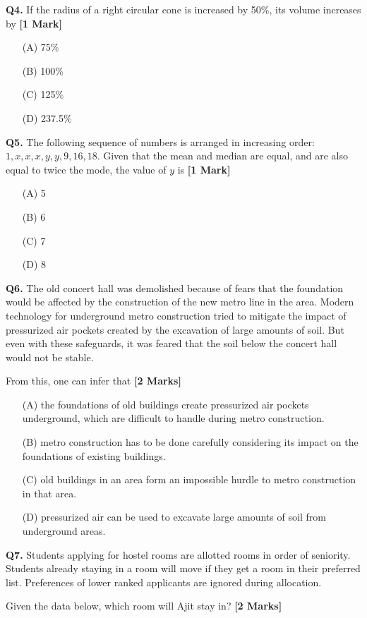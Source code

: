 \documentclass[11pt]{article}
\newcommand{\questiona}[2]{
    \noindent\textbf{Q#2.} #1 \hfill \textbf{[1 Mark]}
}
\newcommand{\questionb}[2]{
    \noindent\textbf{Q#2.} #1 \hfill \textbf{[2 Marks]}
}
\begin{document}
\questiona{If the radius of a right circular cone is increased by 50\%, its volume increases by}{4}
\begin{enumerate}
    \item[(A)] 75\%  
    \item[(B)] 100\%  
    \item[(C)] 125\%  
    \item[(D)] 237.5\%  
\end{enumerate}
\vspace{0.5cm}

\questiona{The following sequence of numbers is arranged in increasing order: $1, x, x, x, y, y, 9, 16, 18$. Given that the mean and median are equal, and are also equal to twice the mode, the value of $y$ is}{5}
\begin{enumerate}
    \item[(A)] 5  
    \item[(B)] 6  
    \item[(C)] 7  
    \item[(D)] 8  
\end{enumerate}
\vspace{0.5cm}

\questionb{The old concert hall was demolished because of fears that the foundation would be affected by the construction of the new metro line in the area. Modern technology for underground metro construction tried to mitigate the impact of pressurized air pockets created by the excavation of large amounts of soil. But even with these safeguards, it was feared that the soil below the concert hall would not be stable.

From this, one can infer that}{6}
\begin{enumerate}
    \item[(A)] the foundations of old buildings create pressurized air pockets underground, which are difficult to handle during metro construction.  
    \item[(B)] metro construction has to be done carefully considering its impact on the foundations of existing buildings.  
    \item[(C)] old buildings in an area form an impossible hurdle to metro construction in that area.  
    \item[(D)] pressurized air can be used to excavate large amounts of soil from underground areas.  
\end{enumerate}
\vspace{0.5cm}

\questionb{Students applying for hostel rooms are allotted rooms in order of seniority. Students already staying in a room will move if they get a room in their preferred list. Preferences of lower ranked applicants are ignored during allocation.

Given the data below, which room will Ajit stay in?}{7}
\end{document}

